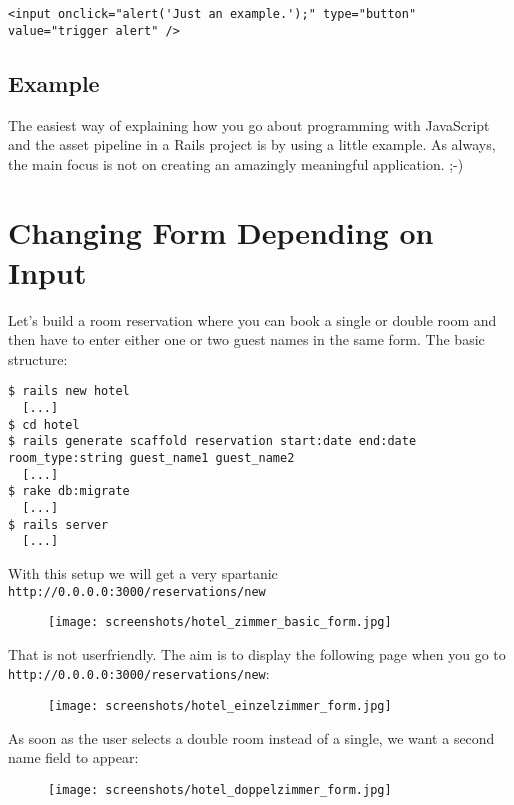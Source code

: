 \documentclass[a4paper]{book}
\newcommand{\chap}[1]{\newpage\thispagestyle{empty}\chapter{#1}\label{chap:\thechapter}}
\begin{document}
\begin{shaded}\begin{verbatim}
<input onclick="alert('Just an example.');" type="button" value="trigger alert" />
\end{verbatim}\end{shaded}

\section{Example}\label{example}

The easiest way of explaining how you go about programming with JavaScript and the asset pipeline in a Rails project is by using a little example. As always, the main focus is not on creating an amazingly meaningful application. ;-)

\chap{Changing Form Depending on Input}\label{changing-form-depending-on-input}

Let's build a room reservation where you can book a single or double room and then have to enter either one or two guest names in the same form. The basic structure:

\begin{shaded}\begin{verbatim}
$ rails new hotel
  [...]
$ cd hotel
$ rails generate scaffold reservation start:date end:date room_type:string guest_name1 guest_name2
  [...]
$ rake db:migrate
  [...]
$ rails server
  [...]
\end{verbatim}\end{shaded}

With this setup we will get a very spartanic \texttt{http://0.0.0.0:3000/reservations/new}

\begin{figure}[htbp]
\centering
\texttt{[image: screenshots/hotel\_zimmer\_basic\_form.jpg]}
\end{figure}

That is not userfriendly. The aim is to display the following page when you go to \texttt{http://0.0.0.0:3000/reservations/new}:

\begin{figure}[htbp]
\centering
\texttt{[image: screenshots/hotel\_einzelzimmer\_form.jpg]}
\end{figure}

As soon as the user selects a double room instead of a single, we want a second name field to appear:

\begin{figure}[htbp]
\centering
\texttt{[image: screenshots/hotel\_doppelzimmer\_form.jpg]}
\end{figure}
\end{document}
